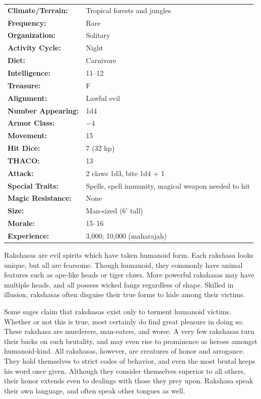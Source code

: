 \begin{multicols}{2}
\begin{minipage}{\columnwidth}
\noindent \begin{tabular}{p{}p{}}
\textbf{Climate/Terrain:}	& Tropical forests and jungles	\\
\textbf{Frequency:} 		& Rare	\\
\textbf{Organization:} 		& Solitary	\\
\textbf{Activity Cycle:} 	& Night	\\
\textbf{Diet:} 				& Carnivore	\\
\textbf{Intelligence:} 		& 11--12	\\
\textbf{Treasure:} 			& F	\\
\textbf{Alignment:} 		& Lawful evil	\\
\hline
\textbf{Number Appearing:} 	& 1d4	\\
\textbf{Armor Class:} 		& $-4$	\\
\textbf{Movement:} 			& 15	\\
\textbf{Hit Dice:} 			& 7 (32 hp)	\\
\textbf{THACO:} 			& 13	\\
\textbf{Attack:} 			& 2 claws 1d3, bite 1d4 + 1	\\
\textbf{Special Traits:} & Spells, spell immunity, magical weapon needed to hit	\\
\textbf{Magic Resistance:} 	& None	\\
\textbf{Size:} 				& Man-sized (6' tall)	\\
\textbf{Morale:} 			& 15--16	\\
\textbf{Experience:} 		& 3,000; 10,000 (maharajah)	\\
\end{tabular}

\end{minipage}

Rakshasas are evil spirits which have taken humanoid form. Each rakshasa looks unique, but all are fearsome. Though humanoid, they commonly have animal features such as ape-like heads or tiger claws. More powerful rakshasas may have multiple heads, and all possess wicked fangs regardless of shape. Skilled in illusion, rakshasas often disguise their true forms to hide among their victims. 

Some sages claim that rakshasas exist only to torment humanoid victims. Whether or not this is true, most certainly do find great pleasure in doing so. These rakshasa are murderers, man-eaters, and worse. A very few rakshasas turn their backs on such brutality, and may even rise to prominence as heroes amongst humanoid-kind. All rakshasas, however, are creatures of honor and arrogance. They hold themselves to strict codes of behavior, and even the most brutal keeps his word once given. Although they consider themselves superior to all others, their honor extends even to dealings with those they prey upon. Rakshasa speak their own language, and often speak other tongues as well.


\end{multicols}
